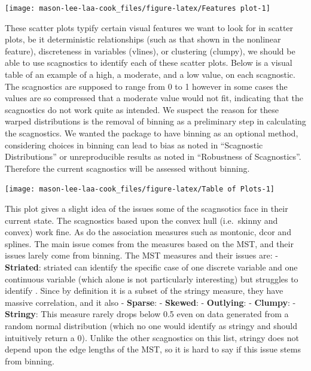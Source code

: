 \begin{Schunk}

\texttt{[image: mason-lee-laa-cook\_files/figure-latex/Features plot-1]} \end{Schunk}

These scatter plots typify certain visual features we want to look for
in scatter plots, be it deterministic relationships (such as that shown
in the nonlinear feature), discreteness in variables (vlines), or
clustering (clumpy), we should be able to use scagnostics to identify
each of these scatter plots. Below is a visual table of an example of a
high, a moderate, and a low value, on each scagnostic. The scagnostics
are supposed to range from 0 to 1 however in some cases the values are
so compressed that a moderate value would not fit, indicating that the
scagnostics do not work quite as intended. We suspect the reason for
these warped distributions is the removal of binning as a preliminary
step in calculating the scagnostics. We wanted the package to have
binning as an optional method, considering choices in binning can lead
to bias as noted in ``Scagnostic Distributions'' or unreproducible
results as noted in ``Robustness of Scagnostics''. Therefore the current
scagnostics will be assessed without binning.

\begin{Schunk}

\texttt{[image: mason-lee-laa-cook\_files/figure-latex/Table of Plots-1]} \end{Schunk}

This plot gives a slight idea of the issues some of the scagnsotics face
in their current state. The scagnostics based upon the convex hull
(i.e.~skinny and convex) work fine. As do the association measures such
as montonic, dcor and splines. The main issue comes from the measures
based on the MST, and their issues larely come from binning. The MST
measures and their issues are: - \textbf{Striated}: striated can
identify the specific case of one discrete variable and one continuous
variable (which alone is not particularly interesting) but struggles to
identify . Since by definition it is a subset of the stringy measure,
they have massive correlation, and it also - \textbf{Sparse}: -
\textbf{Skewed}: - \textbf{Outlying}: - \textbf{Clumpy}: -
\textbf{Stringy}: This measure rarely drops below 0.5 even on data
generated from a random normal distribution (which no one would identify
as stringy and should intuitively return a 0). Unlike the other
scagnostics on this list, stringy does not depend upon the edge lengths
of the MST, so it is hard to say if this issue stems from binning.


